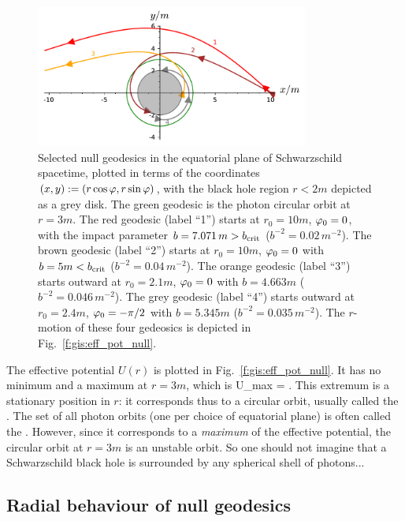 \begin{figure}
\centerline{\includegraphics[width=0.8\textwidth]{ges_null_geod.pdf}}
\caption[]{\label{f:gis:null_geod} \footnotesize
Selected null geodesics in the equatorial plane of Schwarzschild spacetime,
plotted in terms
of the coordinates $(x,y) := (r\cos\varphi, r\sin\varphi)$, with the black hole
region $r<2m$ depicted as a grey disk.
The green geodesic is the photon circular orbit at $r=3m$.
The red geodesic (label ``1'') starts at $r_0=10 m$, $\varphi_0=0$, with
the impact parameter $b = 7.071 \, m > b_{\rm crit}$ ($b^{-2} = 0.02\, m^{-2}$).
The brown geodesic (label ``2'') starts at $r_0=10 m$, $\varphi_0=0$ with $b = 5 m < b_{\rm crit}$ ($b^{-2} = 0.04\, m^{-2}$).
The orange geodesic (label ``3'') starts outward at $r_0=2.1 m$, $\varphi_0=0$ with $b = 4.663 m$ ($b^{-2} = 0.046\, m^{-2}$).
The grey geodesic (label ``4'') starts outward at $r_0=2.4 m$, $\varphi_0=-\pi/2$ with $b = 5.345 m$ ($b^{-2} = 0.035\, m^{-2}$).
The $r$-motion of these four gedeosics is depicted in
Fig.~\ref{f:gis:eff_pot_null}.}
\end{figure}

The effective potential $U(r)$ is plotted in Fig.~\ref{f:gis:eff_pot_null}.
It has no minimum and a maximum at $r=3m$, which is
\be \label{e:ges:U_max}
    U_{\rm max} =  .
\ee
This extremum is a stationary position in $r$: it corresponds thus to a circular
orbit, usually called the .
The set of all photon orbits (one per choice of equatorial plane) is often
called the .
However, since it corresponds to a \emph{maximum} of the effective potential, the circular
orbit at $r=3m$ is an unstable orbit. So one should not imagine that a
Schwarzschild black hole is surrounded by any spherical shell of photons...


\subsection{Radial behaviour of null geodesics} \label{s:ges:null_radial_behav}

